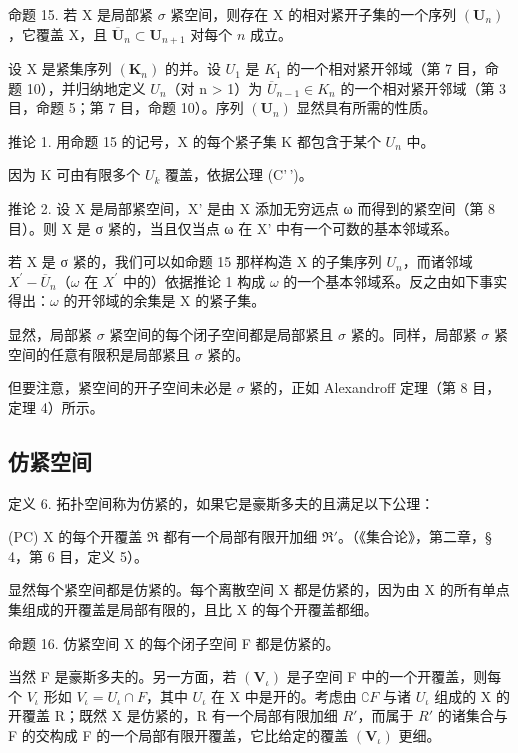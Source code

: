 命题 15. 若 X 是局部紧 \(\sigma\) 紧空间，则存在 X 的相对紧开子集的一个序列 \((\mathbf{U}_n)\)，它覆盖 X，且 \(\overline{\mathbf{U}}_n \subset \mathbf{U}_{n+1}\) 对每个 \(n\) 成立。

设 X 是紧集序列 \((\mathbf{K}_{n})\) 的并。设 \(U_{1}\) 是 \(K_{1}\) 的一个相对紧开邻域（第 7 目，命题 10），并归纳地定义 \(U_{n}\)（对 n \textgreater{} 1）为 \(\overline{U}_{n-1} \in K_{n}\) 的一个相对紧开邻域（第 3 目，命题 5；第 7 目，命题 10）。序列 \((\mathbf{U}_{n})\) 显然具有所需的性质。

推论 1. 用命题 15 的记号，X 的每个紧子集 K 都包含于某个 \(U_{n}\) 中。

因为 K 可由有限多个 \(U_{k}\) 覆盖，依据公理 (C'\,')。

推论 2. 设 X 是局部紧空间，X' 是由 X 添加无穷远点 ω 而得到的紧空间（第 8 目）。则 X 是 σ 紧的，当且仅当点 ω 在 X' 中有一个可数的基本邻域系。

若 X 是 σ 紧的，我们可以如命题 15 那样构造 X 的子集序列 \(U_{n}\)，而诸邻域 \(X^{\prime}-\overline{U}_{n}\)（\(\omega\) 在 \(X^{\prime}\) 中的）依据推论 1 构成 \(\omega\) 的一个基本邻域系。反之由如下事实得出：\(\omega\) 的开邻域的余集是 X 的紧子集。

显然，局部紧 \(\sigma\) 紧空间的每个闭子空间都是局部紧且 \(\sigma\) 紧的。同样，局部紧 \(\sigma\) 紧空间的任意有限积是局部紧且 \(\sigma\) 紧的。

但要注意，紧空间的开子空间未必是 \(\sigma\) 紧的，正如 Alexandroff 定理（第 8 目，定理 4）所示。

\subsection{仿紧空间}

定义 6. 拓扑空间称为仿紧的，如果它是豪斯多夫的且满足以下公理：

(PC) X 的每个开覆盖 \(\Re\) 都有一个局部有限开加细 \(\Re'\)。（《集合论》，第二章，§ 4，第 6 目，定义 5）。

显然每个紧空间都是仿紧的。每个离散空间 X 都是仿紧的，因为由 X 的所有单点集组成的开覆盖是局部有限的，且比 X 的每个开覆盖都细。

命题 16. 仿紧空间 X 的每个闭子空间 F 都是仿紧的。

当然 F 是豪斯多夫的。另一方面，若 \((\mathbf{V}_{\iota})\) 是子空间 F 中的一个开覆盖，则每个 \(V_{\iota}\) 形如 \(V_{\iota} = U_{\iota} \cap F\)，其中 \(U_{\iota}\) 在 X 中是开的。考虑由 \(\complement F\) 与诸 \(U_{\iota}\) 组成的 X 的开覆盖 R；既然 X 是仿紧的，R 有一个局部有限加细 \(R'\)，而属于 \(R'\) 的诸集合与 F 的交构成 F 的一个局部有限开覆盖，它比给定的覆盖 \((\mathbf{V}_{\iota})\) 更细。

